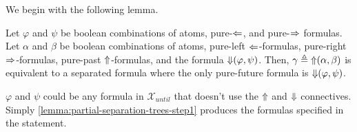 \documentclass[a4paper,UKenglish,cleveref, autoref, thm-restate, numberwithinsect]{lipics-v2021}
\def\Larrow{\ensuremath\mathord{\Leftarrow}}
\def\Rarrow{\ensuremath\mathord{\Rightarrow}}
\def\Uarrow{\ensuremath\mathord{\Uparrow}}
\def\Darrow{\ensuremath\mathord{\Downarrow}}
\begin{document}
We begin with the following lemma.
\begin{lemma}
    \label{lemma:partial-separation-trees-step10}
    Let $\varphi$ and $\psi$ be boolean combinations of atoms, pure-$\Larrow$, and pure-$\Rarrow$ formulas. Let $\alpha$ and $\beta$ be boolean combinations of atoms, pure-left $\Larrow$-formulas, pure-right $\Rarrow$-formulas, pure-past $\Uarrow$-formulas, and the formula $\Darrow(\varphi, \psi)$. Then, $\gamma \triangleq \Uarrow(\alpha, \beta)$ is equivalent to a separated formula where the only pure-future formula is $\Darrow(\varphi, \psi)$.
    \begin{note*}
        $\varphi$ and $\psi$ could be any formula in $\mathcal{X}_{until}$ that doesn't use the $\Uarrow$ and $\Darrow$ connectives. Simply  \cref{lemma:partial-separation-trees-step1} produces the formulas specified in the statement.
    \end{note*}
\end{lemma}
\end{document}

